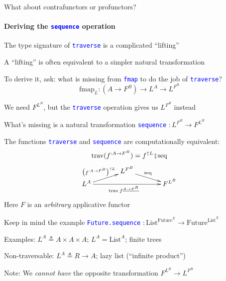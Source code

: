 What about contrafunctors or profunctors?


\paragraph{Deriving the \texttt{\textcolor{blue}{\footnotesize{}sequence}} operation}

\vspace{-0.1cm}The type signature of \texttt{\textcolor{blue}{\footnotesize{}traverse}}
is a complicated \textsf{``}lifting\textsf{''}

A \textsf{``}lifting\textsf{''} is often equivalent to a simpler natural transformation

To derive it, ask: what is missing from \texttt{\textcolor{blue}{\footnotesize{}fmap}}
to do the job of \texttt{\textcolor{blue}{\footnotesize{}traverse}}?{\footnotesize{}
\[
\text{fmap}_{L}:(A\rightarrow F^{B})\rightarrow L^{A}\rightarrow L^{F^{B}}
\]
}{\footnotesize\par}

We need $F^{L^{B}}$, but the \texttt{\textcolor{blue}{\footnotesize{}traverse}}
operation gives us $L^{F^{B}}$ instead

What\textsf{'}s missing is a natural transformation \texttt{\textcolor{blue}{\footnotesize{}sequence}}
$:L^{F^{B}}\rightarrow F^{L^{B}}$ 

The functions \texttt{\textcolor{blue}{\footnotesize{}traverse}} and
\texttt{\textcolor{blue}{\footnotesize{}sequence}} are computationally
equivalent:{\footnotesize{}
\[
\text{trav}(f^{:A\rightarrow F^{B}})=f^{\uparrow L}\bef\text{seq}
\]
\[
\xymatrix{\xyScaleY{0.2pc}\xyScaleX{3pc} & L^{F^{B}}\ar[rd]\sp(0.45){\text{seq}}\\
L^{A}\ar[ru]\sp(0.45){\big(f^{:A\rightarrow F^{B}}\big)^{\uparrow L}}\ar[rr]\sb(0.45){\text{trav}\,f^{\underline{A\rightarrow F^{B}}}} &  & F^{L^{B}}
}
\]
}Here $F$ is an \emph{arbitrary} applicative functor

Keep in mind the example \texttt{\textcolor{blue}{\footnotesize{}Future.sequence}}
$:\text{List}^{\text{Future}^{X}}\rightarrow\text{Future}^{\text{List}^{X}}$

Examples: $L^{A}\triangleq A\times A\times A$; $L^{A}=\text{List}^{A}$;
finite trees 

Non-traversable: $L^{A}\triangleq R\rightarrow A$; lazy list (\textsf{``}infinite
product\textsf{''})

Note: We \emph{cannot have} the opposite transformation $F^{L^{B}}\rightarrow L^{F^{B}}$


